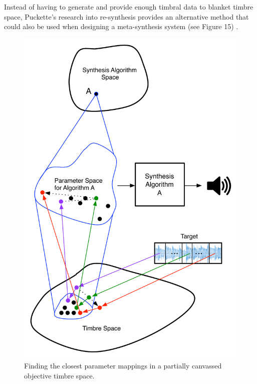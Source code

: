 \documentclass[12pt]{report} 	%
\numberwithin{figure}{chapter}
\numberwithin{table}{chapter}
\numberwithin{equation}{chapter}
\begin{document}
\begin{flushleft}
Instead of having to generate and provide enough timbral data to blanket timbre space, Puckette's research into re-synthesis provides an alternative method that could also be used when designing a meta-synthesis system (see Figure 15) \cite{Puckette:2004zp}.
\begin{figure}[h!]
\begin{center}
\includegraphics[scale=0.75]{PucketteMetaSynthesis}
\caption[Mapping timbre to parameters]{Finding the closest parameter mappings in a partially canvassed objective timbre space.}
\end{center}
\vspace{6pt}
\end{figure}


\end{flushleft}
\end{document}

